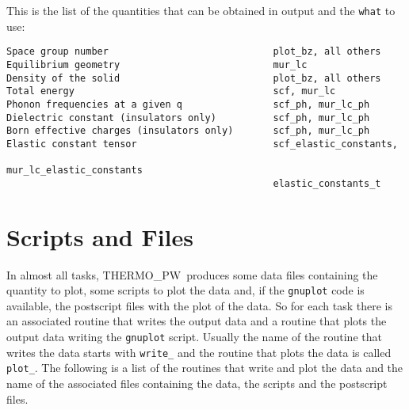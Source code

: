 \documentclass[12pt,a4paper]{article}
\def\tpw{{\sc THERMO\_PW}}
\begin{document}
This is the list of the quantities that can be obtained in output
and the \texttt{what} to use:

\begin{verbatim}
Space group number                             plot_bz, all others
Equilibrium geometry                           mur_lc
Density of the solid                           plot_bz, all others
Total energy                                   scf, mur_lc
Phonon frequencies at a given q                scf_ph, mur_lc_ph
Dielectric constant (insulators only)          scf_ph, mur_lc_ph
Born effective charges (insulators only)       scf_ph, mur_lc_ph
Elastic constant tensor                        scf_elastic_constants, 
                                               mur_lc_elastic_constants
                                               elastic_constants_t
\end{verbatim}

\newpage
\section{\color{coral}Scripts and Files}

In almost all tasks, \tpw\ produces some data files containing the quantity 
to plot, some scripts to plot the data and, if the \texttt{gnuplot} code
is available, the postscript files with the plot of the data. So for each 
task there is an associated routine
that writes the output data and a routine that plots the output data
writing the \texttt{gnuplot} script. Usually the name of the routine that
writes the data starts with \texttt{write\_} and the routine that plots
the data is called \texttt{plot\_}. The following is a list of the routines
that write and plot the data and the name of the associated files
containing the data, the scripts and the postscript files.
\end{document}
